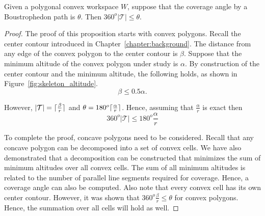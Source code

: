 \documentclass[../main.tex]{subfiles}
\begin{document}
\begin{proposition}
	Given a polygonal convex workspace $W$, suppose that the coverage angle by a Boustrophedon path is $\theta$. Then $360^o|\mathcal{T}|\leq\theta$.
\end{proposition}
\begin{proof}

The proof of this proposition starts with convex polygons. Recall the center contour introduced in Chapter~\ref{chapter:background}. The distance from any edge of the convex polygon to the center contour is $\beta$. Suppose that the minimum altitude of the convex polygon under study is $\alpha$. By construction of the center contour and the minimum altitude, the following holds, as shown in Figure~\ref{fig:skeleton_altitude}.
\begin{equation}
	\beta\leq 0.5\alpha.
\end{equation}

However, $|\mathcal{T}|=\lceil\frac{\beta}{r}\rceil$ and $\theta=180^o\lceil\frac{\alpha}{r}\rceil$. Hence, assuming that $\frac{\alpha}{r}$ is exact then
\begin{equation}
	360^o|\mathcal{T}|\leq180^o\frac{\alpha}{r}
\end{equation}

To complete the proof, concave polygons need to be considered. Recall that any concave polygon can be decomposed into a set of convex cells. We have also demonstrated that a decomposition can be constructed that minimizes the sum of minimum altitudes over all convex cells. The sum of all minimum altitudes is related to the number of parallel line segments required for coverage. Hence, a coverage angle can also be computed. Also note that every convex cell has its own center contour. However, it was shown that $360^o\frac{\beta}{r}\leq\theta$ for convex polygons. Hence, the summation over all cells will hold as well.
\end{proof}


\end{document}
